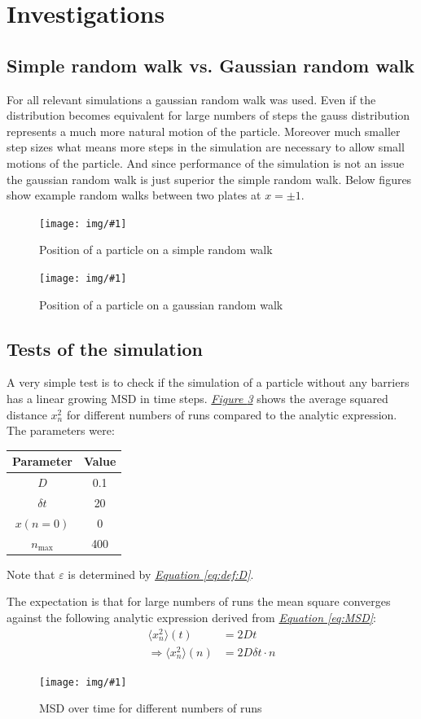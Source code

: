 \documentclass[a4paper, parskip=half]{scrartcl}
\newcommand{\myImage}[2]{
	\begin{figure}[H]
	\centering
	\texttt{[image: img/\#1]}
	\caption{#2}
	\label{pic:#1}
	\end{figure}
}
\newcommand{\myFigRef}[1]{\textit{\hyperref[#1]{Figure \ref*{#1}}}}
\newcommand{\myEqRef}[1]{\textit{\hyperref[eq:#1]{Equation \ref*{eq:#1}}}}
\begin{document}
\newpage
\section{Investigations}
\subsection{Simple random walk vs. Gaussian random walk}

For all relevant simulations a gaussian random walk was used. Even if the distribution becomes equivalent for large numbers of steps the gauss distribution represents a much more natural motion of the particle. Moreover much smaller step sizes what means more steps in the simulation are necessary to allow small motions of the particle. And since performance of the simulation is not an issue the gaussian random walk is just superior the simple random walk. Below figures show example random walks between two plates at $x = \pm 1$.

\myImage{fixed_pos}{Position of a particle on a simple random walk}

\myImage{gauss_pos}{Position of a particle on a gaussian random walk}
\subsection{Tests of the simulation}
A very simple test is to check if the simulation of a particle without any barriers has a linear growing MSD in time steps. \myFigRef{pic:mean_square} shows the average squared distance $x_n^2$ for different numbers of runs compared to the analytic expression. The parameters were:
\begin{center}
\begin{tabular}{c|c}
Parameter & Value \\\hline
$D$ & 0.1 \\
$\delta t$ & 20 \\
$x(n=0)$ & 0 \\
$n_{\mathrm{max}}$ & 400
\end{tabular}
\end{center}
Note that $\varepsilon$ is determined by \myEqRef{def:D}.

The expectation is that for large numbers of runs the mean square converges against the following analytic expression derived from \myEqRef{MSD}:
\begin{align}
\langle x_n^2\rangle (t) &= 2 D t \\
\Rightarrow\langle x_n^2\rangle (n) &= 2 D \delta t \cdot n
\end{align}
\myImage{mean_square}{MSD over time for different numbers of runs}
\end{document}
